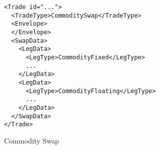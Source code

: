 \begin{listing}[h!]
\begin{verbatim}
<Trade id="...">
  <TradeType>CommoditySwap</TradeType>
  <Envelope>
  </Envelope>
  <SwapData>
    <LegData>
      <LegType>CommodityFixed</LegType>
      ...
    </LegData>
    <LegData>
      <LegType>CommodityFloating</LegType>
      ...
    </LegData>
  </SwapData>
</Trade>
\end{verbatim}
\caption{Commodity Swap}
\label{lst:commodityswap_data}
\end{listing}

